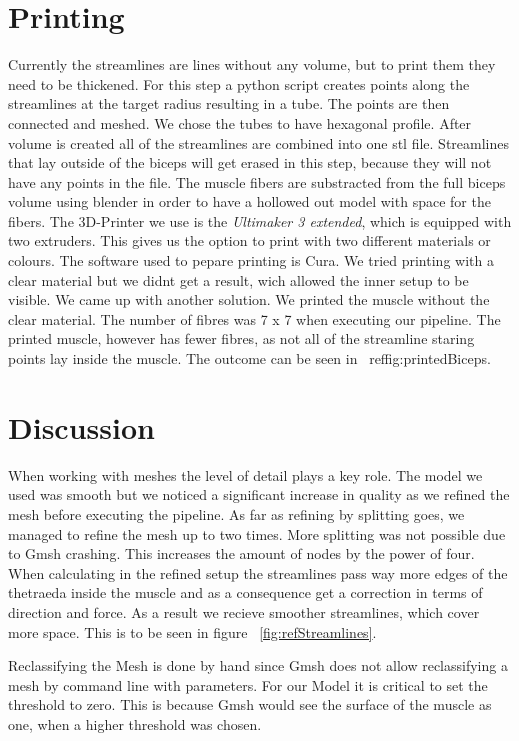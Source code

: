 \documentclass[preprint,journal]{vgtc}       %
\begin{document}
\section{Printing}
Currently the streamlines are lines without any volume, but to print them they need to be thickened. 
For this step a python script creates points along the streamlines at the target radius resulting in a tube.
The points are then connected and meshed. 
We chose the tubes to have hexagonal profile.
After volume is created all of the streamlines are combined into one stl file. 
Streamlines that lay outside of the biceps will get erased in this step, because they will not have any points in the file. 
The muscle fibers are substracted from the full biceps volume using blender in order to have a hollowed out model with space for the fibers. 
The 3D-Printer we use is the \textit{Ultimaker 3 extended}, which is equipped with two extruders. 
This gives us the option to print with two different materials or colours. %
The software used to pepare printing is Cura. 
We tried printing with a clear material but we didnt get a result, wich allowed the inner setup to be visible. 
We came up with another solution. 
We printed the muscle without the clear material. 
The number of fibres was 7 x 7 when executing our pipeline. 
The printed muscle, however has fewer fibres, as not all of the streamline staring points lay inside the muscle. 
The outcome can be seen in ~ref{fig:printedBiceps}. 

\section{Discussion}
When working with meshes the level of detail plays a key role. 
The model we used was smooth but we noticed a significant increase in quality as we refined the mesh before executing the pipeline. 
As far as refining by splitting goes, we managed to refine the mesh up to two times. 
More splitting was not possible due to Gmsh crashing. 
This increases the amount of nodes by the power of four.
When calculating in the refined setup the streamlines pass way more edges of the thetraeda inside the muscle and as a consequence get a correction in terms of direction and force. 
As a result we recieve smoother streamlines, which cover more space. 
This is to be seen in figure ~\ref{fig:refStreamlines}.

Reclassifying the Mesh is done by hand since Gmsh does not allow reclassifying a mesh by command line with parameters. 
For our Model it is critical to set the threshold to zero. 
This is because Gmsh would see the surface of the muscle as one, when a higher threshold was chosen.
\end{document}
